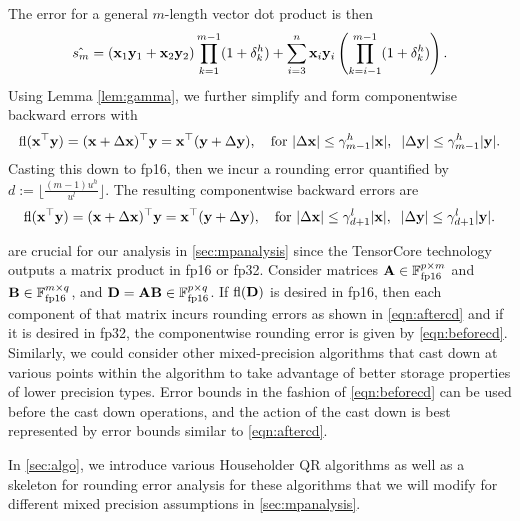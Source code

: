 The error for a general $m$-length vector dot product is then
\begin{equation}
\label{eqn:dperr_2}
\hat{s_m} = (\bb{x}_1\bb{y}_1+\bb{x}_2\bb{y}_2)\prod_{k=1}^{m-1}(1+\dd_{k}^h) + \sum_{i=3}^n \bb{x}_i\bb{y}_i\left(\prod_{k=i-1}^{m-1}(1+\dd_{k}^{h})\right).
\end{equation}
Using Lemma \ref{lem:gamma}, we further simplify and form componentwise backward errors with
\begin{equation}
\fl(\bb{x}^{\top}\bb{y}) =(\bb{x}+\Delta\bb{x})^{\top}\bb{y} = \bb{x}^{\top}(\bb{y}+\Delta\bb{y}),\quad\text{for }|\Delta \bb{x}| \leq \gamma^h_{m-1}|\bb{x}|,\;\; |\Delta \bb{y}|  \leq \gamma_{m-1}^h|\bb{y}|. \label{eqn:beforecd}
\end{equation}
Casting this down to fp16, then we incur a rounding error quantified by $d:=\lfloor\frac{(m-1)u^h}{u^l}\rfloor$. 
The resulting componentwise backward errors are
\begin{equation}
\fl(\bb{x}^{\top}\bb{y}) = (\bb{x}+\Delta\bb{x})^{\top}\bb{y} = \bb{x}^{\top}(\bb{y}+\Delta\bb{y}),\quad\text{for }|\Delta \bb{x}| \leq \gamma^l_{d+1}|\bb{x}|,\;\; |\Delta \bb{y}|  \leq \gamma_{d+1}^l|\bb{y}|. \label{eqn:aftercd}
\end{equation}

 are crucial for our analysis in \cref{sec:mpanalysis} since the TensorCore technology outputs a matrix product in fp16 or fp32. 
Consider matrices $\mathbf{A}\in\mathbb{F}_{\text{fp16}}^{p\times m}$ and $\mathbf{B}\in\mathbb{F}_{\text{fp16}}^{m\times q}$, and $\mathbf{D}=\mathbf{A}\mathbf{B}\in\mathbb{F}_{\text{fp16}}^{p\times q}$.
If $\mathrm{fl}(\mathbf{D})$ is desired in fp16, then each component of that matrix incurs rounding errors as shown in \cref{eqn:aftercd} and if it is desired in fp32, the componentwise rounding error is given by \cref{eqn:beforecd}.
Similarly, we could consider other mixed-precision algorithms that cast down at various points within the algorithm to take advantage of better storage properties of lower precision types. 
Error bounds in the fashion of \cref{eqn:beforecd} can be used before the cast down operations, and the action of the cast down is best represented by error bounds similar to \cref{eqn:aftercd}.\par

In \cref{sec:algo}, we introduce various Householder QR algorithms as well as a skeleton for rounding error analysis for these algorithms that we will modify for different mixed precision assumptions in \cref{sec:mpanalysis}.